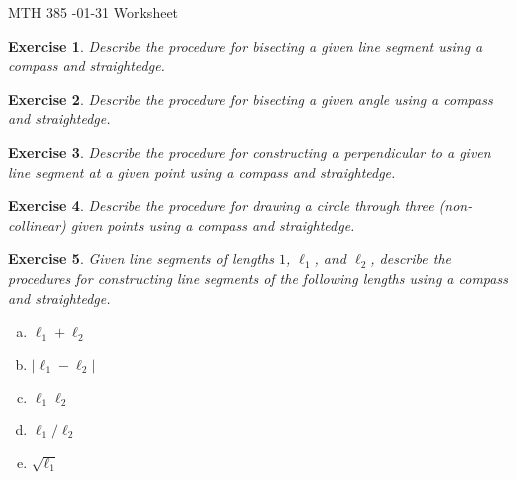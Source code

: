 \documentclass[12pt]{article}
\theoremstyle{plain}
\newtheorem{ex}{Exercise}
\begin{document}
MTH 385 -01-31 Worksheet

\begin{ex}
  Describe the procedure for bisecting a given line segment using a compass and straightedge.
\end{ex}

\begin{ex}
  Describe the procedure for bisecting a given angle using a compass and straightedge.
\end{ex}

\begin{ex}
  Describe the procedure for constructing a perpendicular to a given line segment at a given point using a compass and straightedge.
\end{ex}

\begin{ex}
  Describe the procedure for drawing a circle through three (non-collinear) given points using a compass and straightedge.
\end{ex}

\begin{ex}
  Given line segments of lengths $1$, $\ell_1$, and $\ell_2$, describe the procedures for constructing line segments of the following lengths using a compass and straightedge.
  \begin{enumerate}[(a)]
    \item $\ell_1+\ell_2$
    \item $|\ell_1-\ell_2|$
    \item $\ell_1\ell_2$
    \item $\ell_1/\ell_2$
    \item $\sqrt{\ell_1}$
  \end{enumerate}
\end{ex}
\end{document}
